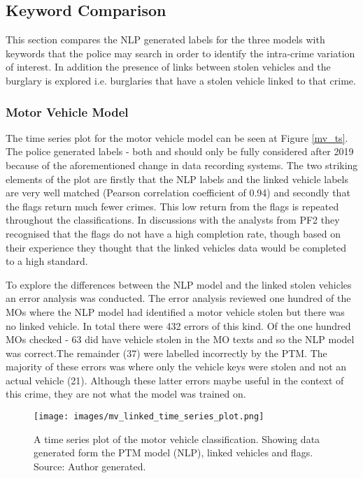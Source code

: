 

\subsection{Keyword Comparison} This section compares the NLP generated labels for the three models with keywords that the police may search in order to identify the intra-crime variation of interest. In addition the presence of links between stolen vehicles and the burglary is explored i.e. burglaries that have a stolen vehicle linked to that crime.

\subsubsection{Motor Vehicle Model} The time series plot for the motor vehicle model can be seen at Figure \ref{mv_ts}. The police generated labels - both  and  should only be fully considered after 2019 because of the aforementioned change in data recording systems. The two striking elements of the plot are firstly that the NLP labels and the linked vehicle labels are very well matched (Pearson correlation coefficient of 0.94) and secondly that the flags return much fewer crimes. This low return from the flags is repeated throughout the classifications. In discussions with the analysts from PF2 they recognised that the flags do not have a high completion rate, though based on their experience they thought that the linked vehicles data would be completed to a high standard. 

To explore the differences between the NLP model and the linked stolen vehicles an error analysis was conducted. The error analysis reviewed one hundred of the MOs where the NLP model had identified a motor vehicle stolen but there was no linked vehicle. In total there were 432 errors of this kind. Of the one hundred MOs checked - 63 did have vehicle stolen in the MO texts and so the NLP model was correct.The remainder (37) were labelled incorrectly by the PTM. The majority of these errors was where only the vehicle keys were stolen and not an actual vehicle (21). Although these latter errors maybe useful in the context of this crime, they are not what the model was trained on.   


\begin{figure}
  \texttt{[image: images/mv\_linked\_time\_series\_plot.png]}
  \caption[Motor vehicle model time series plot]{A time series plot of the motor vehicle classification. Showing data generated form the PTM model (NLP), linked vehicles and flags. Source: Author generated.}
  \label{fig:mv_ts}
\end{figure}


